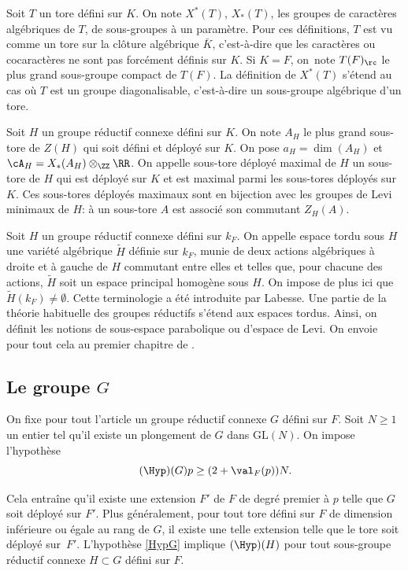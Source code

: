 Soit $T$ un tore défini sur $K$. On note $X^{*}(T)$, \resp $X_{*}(T)$, les groupes de caractères algébriques de $T$, \resp de sous-groupes à un paramètre. Pour ces définitions, $T$ est vu comme un tore sur la clôture algébrique $\bar{K}$, c'est-à-dire que les caractères ou cocaractères ne sont pas forcément définis sur $K$. Si $K=F$, on~note $T(F)_{\rc}$ le plus grand sous-groupe compact de $T(F)$. La définition de $X^*(T)$ s'étend au cas où $T$ est un groupe diagonalisable, c'est-à-dire un sous-groupe algébrique d'un tore.

Soit $H$ un groupe réductif connexe défini sur $K$. On note $A_{H}$ le plus grand sous-tore de $Z(H)$ qui soit défini et déployé sur $K$. On pose $a_{H}=\dim(A_{H})$ et $\cA_{H}=X_{*}(A_{H})\otimes_{\ZZ}\RR$. On appelle sous-tore déployé maximal de $H$ un sous-tore de $H$ qui est déployé sur $K$ et est maximal parmi les sous-tores déployés sur $K$. Ces sous-tores déployés maximaux sont en bijection avec les groupes de Levi minimaux de $H$: à un sous-tore $A$ est associé son commutant $Z_{H}(A)$.

Soit $H$ un groupe réductif connexe défini sur $k_{F}$. On appelle espace tordu sous $H$ une variété algébrique $\tilde{H}$ définie sur $k_{F}$, munie de deux actions algébriques à droite et à gauche de $H$ commutant entre elles et telles que, pour chacune des actions, $\tilde{H}$ soit un espace principal homogène sous $H$. On impose de plus ici que $\tilde{H}(k_{F})\neq\emptyset$. Cette terminologie a été introduite par Labesse. Une partie de la théorie habituelle des groupes réductifs s'étend aux espaces tordus. Ainsi, on définit les notions de sous-espace parabolique ou d'espace de Levi. On envoie pour tout cela au premier chapitre de \cite{MW}.

\subsection{Le groupe \texorpdfstring{$G$}{G}}\label{legroupeG}

On fixe pour tout l'article un groupe réductif connexe $G$ défini sur $F$. Soit $N\geq1$ un entier tel qu'il existe un plongement de $G$ dans $\mathrm{GL}(N)$.
On impose l'hypothèse
\begin{equation}\tag*{$\textup{(\Hyp)}(G)$}\label{HypG}
p\geq (2+\val_{F}(p))N.
\end{equation}

Cela
entraîne qu'il existe une extension $F'$ de $F$ de degré premier à $p$ telle que $G$ soit déployé sur $F'$. Plus généralement, pour tout tore défini sur $F$ de dimension inférieure ou égale au rang de $G$, il existe une telle extension telle que le tore soit déployé sur~$F'$. L'hypothèse \ref{HypG} implique $(\Hyp)(H)$ pour tout sous-groupe réductif connexe $H\subset G$ défini sur $F$.

